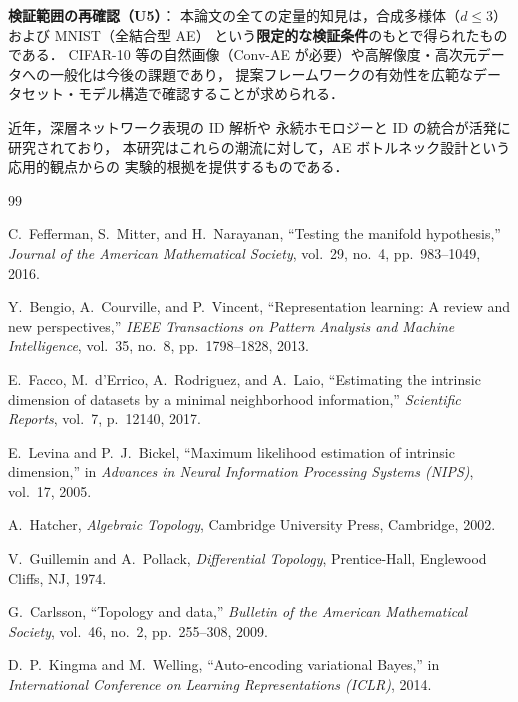\documentclass[12pt,a4paper]{jsarticle}
\begin{document}
\textbf{検証範囲の再確認（U5）}：
本論文の全ての定量的知見は，合成多様体（$d \leq 3$）および MNIST（全結合型 AE）
という\textbf{限定的な検証条件}のもとで得られたものである．
CIFAR-10 等の自然画像（Conv-AE が必要）や高解像度・高次元データへの一般化は今後の課題であり，
提案フレームワークの有効性を広範なデータセット・モデル構造で確認することが求められる．

近年，深層ネットワーク表現の ID 解析\cite{ansuini2019intrinsic,valeriani2023geometry}や
永続ホモロジーと ID の統合\cite{birdal2021intrinsic,carlsson2009topology}が活発に研究されており，
本研究はこれらの潮流に対して，AE ボトルネック設計という応用的観点からの
実験的根拠を提供するものである．

\begin{thebibliography}{99}

C.~Fefferman, S.~Mitter, and H.~Narayanan,
``Testing the manifold hypothesis,''
\textit{Journal of the American Mathematical Society}, vol.~29, no.~4,
pp.~983--1049, 2016.

Y.~Bengio, A.~Courville, and P.~Vincent,
``Representation learning: A review and new perspectives,''
\textit{IEEE Transactions on Pattern Analysis and Machine Intelligence},
vol.~35, no.~8, pp.~1798--1828, 2013.

E.~Facco, M.~d'Errico, A.~Rodriguez, and A.~Laio,
``Estimating the intrinsic dimension of datasets by a minimal neighborhood information,''
\textit{Scientific Reports}, vol.~7, p.~12140, 2017.

E.~Levina and P.~J.~Bickel,
``Maximum likelihood estimation of intrinsic dimension,''
in \textit{Advances in Neural Information Processing Systems (NIPS)}, vol.~17, 2005.

A.~Hatcher,
\textit{Algebraic Topology},
Cambridge University Press, Cambridge, 2002.

V.~Guillemin and A.~Pollack,
\textit{Differential Topology},
Prentice-Hall, Englewood Cliffs, NJ, 1974.

G.~Carlsson,
``Topology and data,''
\textit{Bulletin of the American Mathematical Society},
vol.~46, no.~2, pp.~255--308, 2009.

D.~P.~Kingma and M.~Welling,
``Auto-encoding variational Bayes,''
in \textit{International Conference on Learning Representations (ICLR)}, 2014.


\end{thebibliography}
\end{document}
